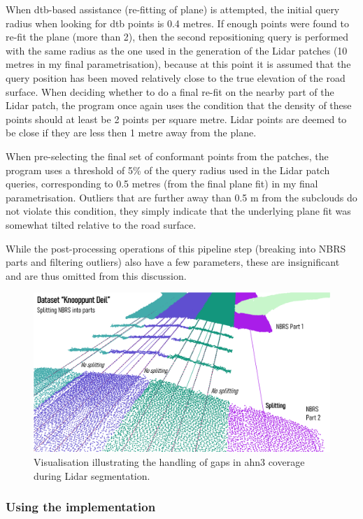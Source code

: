 When \ac{dtb}-based assistance (re-fitting of plane) is attempted, the initial query radius when looking for \ac{dtb} points is 0.4 metres. If enough points were found to re-fit the plane (more than 2), then the second repositioning query is performed with the same radius as the one used in the generation of the Lidar patches (10 metres in my final parametrisation), because at this point it is assumed that the query position has been moved relatively close to the true elevation of the road surface. When deciding whether to do a final re-fit on the nearby part of the Lidar patch, the program once again uses the condition that the density of these points should at least be 2 points per square metre. Lidar points are deemed to be close if they are less then 1 metre away from the plane.

When pre-selecting the final set of conformant points from the patches, the program uses a threshold of 5\% of the query radius used in the Lidar patch queries, corresponding to 0.5 metres (from the final plane fit) in my final parametrisation. Outliers that are further away than 0.5 m from the subclouds do not violate this condition, they simply indicate that the underlying plane fit was somewhat tilted relative to the road surface.

While the post-processing operations of this pipeline step (breaking into NBRS parts and filtering outliers) also have a few parameters, these are insignificant and are thus omitted from this discussion.

\begin{figure}
    \centering
    \includegraphics[width=0.92\linewidth]{final_report/figs/lidarsegmentation2.png}
    \caption{Visualisation illustrating the handling of gaps in \ac{ahn3} coverage during Lidar segmentation.}
    \label{fig:lidarsegmentation2}
\end{figure}

\subsubsection{Using the implementation}

